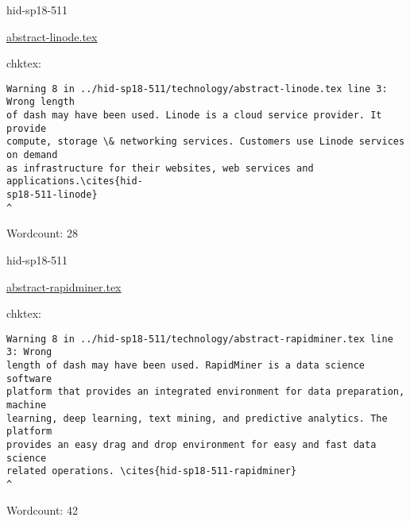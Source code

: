 

\begin{IU}

hid-sp18-511

\href{https://github.com/cloudmesh-community/hid-sp18-511/blob/master//technology/abstract-linode.tex}{abstract-linode.tex}

 
chktex:
\begin{tiny}
\begin{verbatim}
Warning 8 in ../hid-sp18-511/technology/abstract-linode.tex line 3: Wrong length
of dash may have been used. Linode is a cloud service provider. It provide
compute, storage \& networking services. Customers use Linode services on demand
as infrastructure for their websites, web services and applications.\cites{hid-
sp18-511-linode}
^
\end{verbatim}
\end{tiny}

Wordcount: 28

\end{IU}



\begin{IU}

hid-sp18-511

\href{https://github.com/cloudmesh-community/hid-sp18-511/blob/master//technology/abstract-rapidminer.tex}{abstract-rapidminer.tex}

 
chktex:
\begin{tiny}
\begin{verbatim}
Warning 8 in ../hid-sp18-511/technology/abstract-rapidminer.tex line 3: Wrong
length of dash may have been used. RapidMiner is a data science software
platform that provides an integrated environment for data preparation, machine
learning, deep learning, text mining, and predictive analytics. The platform
provides an easy drag and drop environment for easy and fast data science
related operations. \cites{hid-sp18-511-rapidminer}
^
\end{verbatim}
\end{tiny}

Wordcount: 42

\end{IU}



